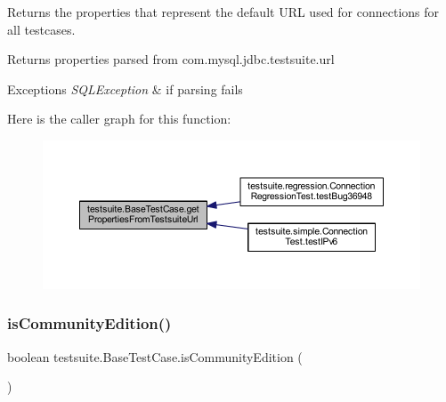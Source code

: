 Returns the properties that represent the default U\+RL used for connections for all testcases.

\begin{DoxyReturn}{Returns}
properties parsed from com.\+mysql.\+jdbc.\+testsuite.\+url
\end{DoxyReturn}

\begin{DoxyExceptions}{Exceptions}
{\em S\+Q\+L\+Exception} & if parsing fails \\
\hline
\end{DoxyExceptions}
Here is the caller graph for this function\+:
\nopagebreak
\begin{figure}[H]
\begin{center}
\leavevmode
\includegraphics[width=350pt]{classtestsuite_1_1_base_test_case_ab63fc653810c4915e190196e7b3d6e6c_icgraph}
\end{center}
\end{figure}
\mbox{\label{classtestsuite_1_1_base_test_case_a30a8a94757291826321a07c5b10a6233}} 
\subsubsection{\texorpdfstring{is\+Community\+Edition()}{isCommunityEdition()}}
{\footnotesize\ttfamily boolean testsuite.\+Base\+Test\+Case.\+is\+Community\+Edition (\begin{DoxyParamCaption}{ }\end{DoxyParamCaption})\hspace{0.3cm}{\ttfamily [protected]}}

